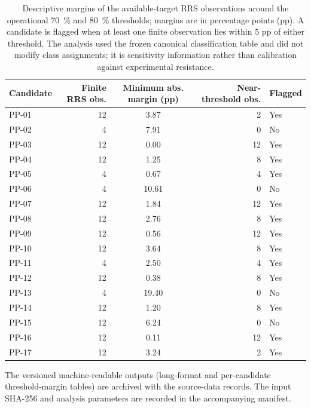 \begin{table}[htbp]
\centering
\scriptsize
\caption{Descriptive margins of the available-target RRS observations around the operational \qty{70}{\percent} and \qty{80}{\percent} thresholds; margins are in percentage points (pp). A candidate is flagged when at least one finite observation lies within 5 pp of either threshold. The analysis used the frozen canonical classification table and did not modify class assignments; it is sensitivity information rather than calibration against experimental resistance.}
\label{tab:s18_rrs_margin_sensitivity}
\begin{tabularx}{\textwidth}{l r S[table-format=2.2] r l}
\toprule
Candidate & {Finite RRS obs.} & {Minimum abs. margin (pp)} & {Near-threshold obs.} & {Flagged} \\
\midrule
PP-01 & 12 & 3.87 & 2 & Yes \\
PP-02 & 4 & 7.91 & 0 & No \\
PP-03 & 12 & 0.00 & 12 & Yes \\
PP-04 & 12 & 1.25 & 8 & Yes \\
PP-05 & 4 & 0.67 & 4 & Yes \\
PP-06 & 4 & 10.61 & 0 & No \\
PP-07 & 12 & 1.84 & 12 & Yes \\
PP-08 & 12 & 2.76 & 8 & Yes \\
PP-09 & 12 & 0.56 & 12 & Yes \\
PP-10 & 12 & 3.64 & 8 & Yes \\
PP-11 & 4 & 2.50 & 4 & Yes \\
PP-12 & 12 & 0.38 & 8 & Yes \\
PP-13 & 4 & 19.40 & 0 & No \\
PP-14 & 12 & 1.20 & 8 & Yes \\
PP-15 & 12 & 6.24 & 0 & No \\
PP-16 & 12 & 0.11 & 12 & Yes \\
PP-17 & 12 & 3.24 & 2 & Yes \\
\bottomrule
\end{tabularx}
\end{table}

\noindent The versioned machine-readable outputs (long-format and per-candidate threshold-margin tables) are archived with the source-data records. The input SHA-256 and analysis parameters are recorded in the accompanying manifest.
